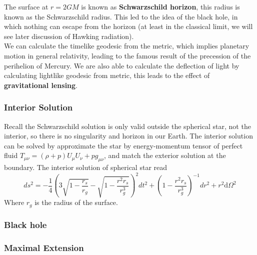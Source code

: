 \documentclass[12pt]{article}
\theoremstyle{mystyle}{\newtheorem{definition}{Definition}[section]}
\theoremstyle{mystyle}{\newtheorem{theorem}[definition]{Theorem}}
\theoremstyle{mystyle}{\newtheorem*{remark}{Remark}}
\theoremstyle{mystyle}{\newtheorem*{example}{Example}}
\theoremstyle{mystyle}{\newtheorem*{examples}{Examples}}
\theoremstyle{cstyle}{\newtheorem*{cthm}{}}
\begin{document}
The surface at \(r = 2GM\) is known as \textbf{Schwarzschild horizon}, this radius is known as the Schwarzschild radius.
This led to the idea of the black hole, in which nothing can escape from the horizon (at least in the classical limit, we will see later discussion of Hawking radiation). \\
We can calculate the timelike geodesic from the metric, which implies planetary motion in general relativity, leading to the famous result of the precession of the perihelion of Mercury.
We are also able to calculate the deflection of light by calculating lightlike geodesic from metric, this leads to the effect of \textbf{gravitational lensing}.

\subsubsection{Interior Solution}

Recall the Schwarzschild solution is only valid outside the spherical star, not the interior, so there is no singularity and horizon in our Earth.
The interior solution can be solved by approximate the star by energy-momentum tensor of perfect fluid \(T_{\mu\nu} = (\rho + p)U_\mu U_\nu + pg_{\mu\nu}\),
and match the exterior solution at the boundary. The interior solution of spherical star read \[ds^{2} =
  -\frac{1}{4} \left( 3 \sqrt{1-\frac {r_s}{r_g}}-\sqrt{1-\frac{r^2 r_s}{r_g^3}} \right)^2 dt^2 +
  \left( 1-\frac{r^2 r_s}{r_g^3} \right)^{-1} dr^2 + r^2 \mathrm{d}\Omega^2\]
Where \(r_{g}\) is the radius of the surface.

\subsubsection{Black hole}

\subsubsection{Maximal Extension}
\end{document}
